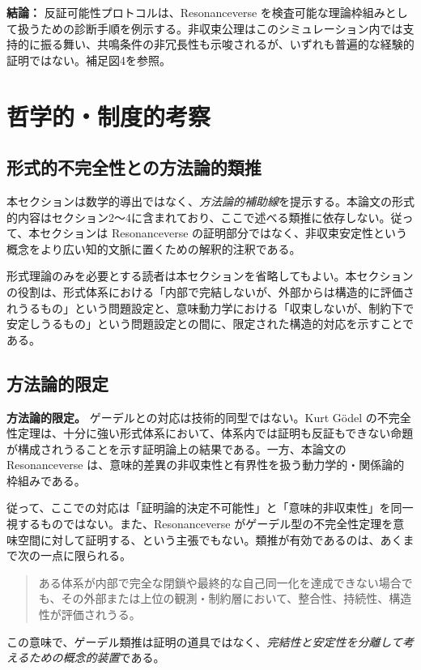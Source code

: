 \documentclass[11pt,a4paper]{article}
\theoremstyle{definition}
\begin{document}
\textbf{結論：} 反証可能性プロトコルは、Resonanceverse を検査可能な理論枠組みとして扱うための診断手順を例示する。非収束公理はこのシミュレーション内では支持的に振る舞い、共鳴条件の非冗長性も示唆されるが、いずれも普遍的な経験的証明ではない。補足図4を参照。

\section{哲学的・制度的考察}
\subsection{形式的不完全性との方法論的類推}

本セクションは数学的導出ではなく、\textit{方法論的補助線}を提示する。本論文の形式的内容はセクション2～4に含まれており、ここで述べる類推に依存しない。従って、本セクションは Resonanceverse の証明部分ではなく、非収束安定性という概念をより広い知的文脈に置くための解釈的注釈である。

形式理論のみを必要とする読者は本セクションを省略してもよい。本セクションの役割は、形式体系における「内部で完結しないが、外部からは構造的に評価されうるもの」という問題設定と、意味動力学における「収束しないが、制約下で安定しうるもの」という問題設定との間に、限定された構造的対応を示すことである。

\subsection{方法論的限定}

\textbf{方法論的限定。} ゲーデルとの対応は技術的同型ではない。Kurt Gödel の不完全性定理は、十分に強い形式体系において、体系内では証明も反証もできない命題が構成されうることを示す証明論上の結果である。一方、本論文の Resonanceverse は、意味的差異の非収束性と有界性を扱う動力学的・関係論的枠組みである。

従って、ここでの対応は「証明論的決定不可能性」と「意味的非収束性」を同一視するものではない。また、Resonanceverse がゲーデル型の不完全性定理を意味空間に対して証明する、という主張でもない。類推が有効であるのは、あくまで次の一点に限られる。

\begin{quote}
ある体系が内部で完全な閉鎖や最終的な自己同一化を達成できない場合でも、その外部または上位の観測・制約層において、整合性、持続性、構造性が評価されうる。
\end{quote}

この意味で、ゲーデル類推は証明の道具ではなく、\textit{完結性と安定性を分離して考えるための概念的装置}である。
\end{document}
